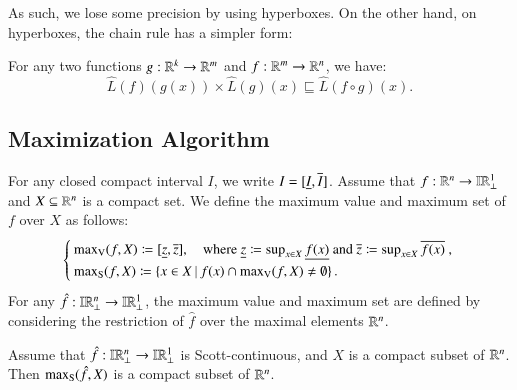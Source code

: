 \documentclass[11pt,times]{article}
\begin{document}
As such, we lose some precision by using hyperboxes. On the other
hand, on hyperboxes, the chain rule has a simpler form:
  \begin{lemma}
    \label{lem:chain_Rule_hat_L}
    For any two functions $g : \R^k \to \R^m$ and $f: \R^m \to \R^n$,
    we have:
    \begin{equation*}
      \hat{L}(f)(g(x))  \times  \hat{L}(g)(x)
      \sqsubseteq \hat{L}(f \circ g)(x).
    \end{equation*}
%    
  \end{lemma}



 
\subsection{Maximization Algorithm}
\label{subsec:Maximization_algorithm}


For any closed compact interval $I$, we write
$I = [\lep[I], \uep[I]]$. Assume that
$f : \R^n \to \intvaldom[\R^1\lift]$ and $X \subseteq \R^n$ is a
compact set. We define the maximum value and maximum set of $f$ over
$X$ as follows:
%
\begin{equation}
  \label{eq:maxV_maxS}
  \left\{
    \arrayoptions{0.5ex}{1.3}
    \begin{array}{l}
      \maxV(f,X) \defeq [\lep[z],\uep[z]], \quad \text{where $\lep[z] \defeq \sup_{x \in X} \lep[f(x)]$ and
$\uep[z] \defeq \sup_{x \in X} \uep[f(x)]$ },  \\
      \maxS(f,X) \defeq \setbarTall{x \in X}{ f(x) \cap \maxV(f,X) \neq
      \emptyset}. 
    \end{array}
  \right.
\end{equation}
%
\noindent
For any $\hat{f}: \intvaldom[\R^n\lift] \to \intvaldom[\R^1\lift]$,
the maximum value and maximum set are defined by considering the
restriction of $\hat{f}$ over the maximal elements $\R^n$.



\begin{proposition}
  \label{prop:maxS_compact}
  Assume that $\hat{f}: \intvaldom[\R^n\lift] \to \intvaldom[\R^1\lift]$ is
  Scott-continuous, and $X$ is a compact subset of $\R^n$. Then
  $\maxS(\hat{f},X)$ is a compact subset of $\R^n$.
\end{proposition}
\end{document}
